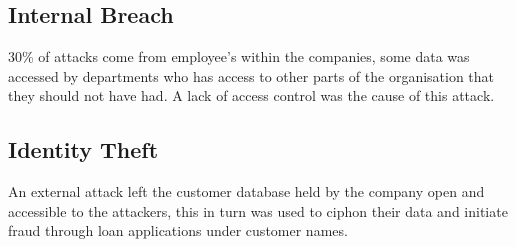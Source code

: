 \subsection{Internal Breach}
30\% of attacks come from employee's within the companies, some data was accessed by departments who has access to other parts of the organisation that they should not have had. A lack of access control was the cause of this attack.
\subsection{Identity Theft}
An external attack left the customer database held by the company open and accessible to the attackers, this in turn was used to ciphon their data and initiate fraud through loan applications under customer names.